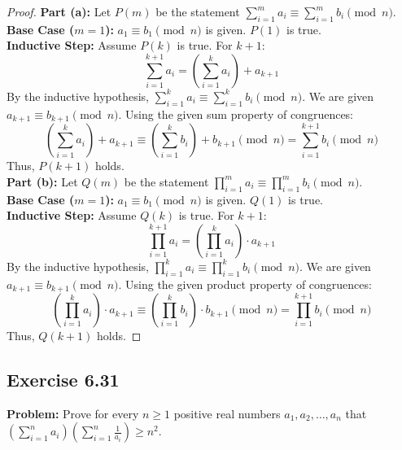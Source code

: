\documentclass[11pt, a4paper]{article}
\theoremstyle{definition}
\theoremstyle{remark}
\begin{document}
\begin{proof}
\textbf{Part (a):} Let $P(m)$ be the statement $\sum_{i=1}^m a_i \equiv \sum_{i=1}^m b_i \pmod n$.
\vspace{4pt} \\
\textbf{Base Case ($m = 1$):} $a_1 \equiv b_1 \pmod n$ is given. $P(1)$ is true.
\vspace{4pt} \\
\textbf{Inductive Step:} Assume $P(k)$ is true. For $k+1$:
\[ \sum_{i=1}^{k+1} a_i = \left(\sum_{i=1}^k a_i\right) + a_{k+1} \]
By the inductive hypothesis, $\sum_{i=1}^k a_i \equiv \sum_{i=1}^k b_i \pmod n$. We are given $a_{k+1} \equiv b_{k+1} \pmod n$. Using the given sum property of congruences:
\[ \left(\sum_{i=1}^k a_i\right) + a_{k+1} \equiv \left(\sum_{i=1}^k b_i\right) + b_{k+1} \pmod n = \sum_{i=1}^{k+1} b_i \pmod n \]
Thus, $P(k+1)$ holds.
\vspace{4pt} \\
\textbf{Part (b):} Let $Q(m)$ be the statement $\prod_{i=1}^m a_i \equiv \prod_{i=1}^m b_i \pmod n$.
\vspace{4pt} \\
\textbf{Base Case ($m = 1$):} $a_1 \equiv b_1 \pmod n$ is given. $Q(1)$ is true.
\vspace{4pt} \\
\textbf{Inductive Step:} Assume $Q(k)$ is true. For $k+1$:
\[ \prod_{i=1}^{k+1} a_i = \left(\prod_{i=1}^k a_i\right) \cdot a_{k+1} \]
By the inductive hypothesis, $\prod_{i=1}^k a_i \equiv \prod_{i=1}^k b_i \pmod n$. We are given $a_{k+1} \equiv b_{k+1} \pmod n$. Using the given product property of congruences:
\[ \left(\prod_{i=1}^k a_i\right) \cdot a_{k+1} \equiv \left(\prod_{i=1}^k b_i\right) \cdot b_{k+1} \pmod n = \prod_{i=1}^{k+1} b_i \pmod n \]
Thus, $Q(k+1)$ holds.
\end{proof}

\subsection{Exercise 6.31}
\textbf{Problem:} Prove for every $n \ge 1$ positive real numbers $a_1, a_2, \dots, a_n$ that $\left(\sum_{i=1}^n a_i\right)\left(\sum_{i=1}^n \frac{1}{a_i}\right) \ge n^2$.
\end{document}
